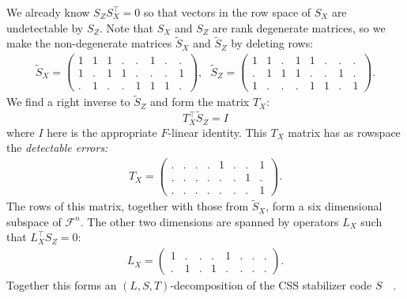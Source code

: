 \documentclass[11pt,twoside,openright]{report}
\newcommand{\Field}{\mathcal{F}}
\begin{document}
We already know $S_ZS_X^\top=0$ so that vectors in the row space 
of $S_X$ are undetectable by $S_Z.$
Note that $S_X$ and $S_Z$ are rank degenerate matrices, so
we make the non-degenerate matrices $\tilde{S}_X$ and $\tilde{S}_Z$ 
by deleting rows:
\begin{align*}
\tilde{S}_X = \left( \begin{array}{cccccccc}
1&1&1&.&.&1&.&.\\
1&.&1&1&.&.&.&1\\
.&1&.&.&1&1&1&.
\end{array} \right),\ \ \ 
\tilde{S}_Z = \left( \begin{array}{cccccccc}
1&1&.&1&1&.&.&.\\
.&1&1&1&.&.&1&.\\
1&.&.&.&1&1&.&1
\end{array} \right).
\end{align*}
We find a right inverse to $\tilde{S}_Z$ and form the matrix $T_X$:
$$
    T_X^\top \tilde{S}_Z = I
$$
where $I$ here is the appropriate $F$-linear identity.
This $T_X$ matrix has as rowspace the \emph{detectable errors:}
\begin{align*}
T_X = \left( \begin{array}{cccccccc}
.&.&.&.&1&.&.&1\\
.&.&.&.&.&.&1&.\\
.&.&.&.&.&.&.&1
\end{array} \right).
\end{align*}
The rows of this matrix,
together with those from $\tilde{S}_X$, form a six dimensional
subspace of $\Field^n$.
The other two dimensions are
spanned by operators $L_X$ such that $L_X^\top S_Z=0:$ 
\begin{align*}
L_X = \left( \begin{array}{cccccccc}
1&.&.&.&1&.&.&.\\
.&1&.&1&.&.&.&.
\end{array} \right).
\end{align*}
Together this forms an $(L,S,T)$-decomposition of the CSS
stabilizer code $S$\ \ \cite{Duclos-Cianci2010a,Yoshida2010}.
\end{document}
